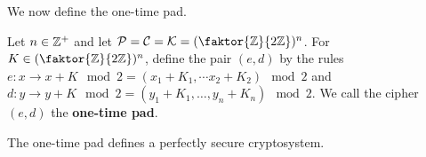 We now define the one-time pad.

\begin{definition}
    Let $n \in \mathbb{Z}^+$ and let  $\Pc=\Cc=\Kc=(\faktor{\Z}{2\Z})^n$. For $K \in
    (\faktor{\Z}{2\Z})^n$, define the pair $(e,d)$ by the rules $e:x \rightarrow
    x+K \mod{2}=(x_1+K_1, \dotsm x_2+K_2) \mod{2}$ and $d:y \rightarrow y+K
    \mod{2}=(y_1+K_1, \dots, y_n+K_n) \mod{2}$. We call the cipher $(e,d)$ the
    \textbf{one-time pad}.
\end{definition}

\begin{theorem}\label{2.1.3}
    The one-time pad defines a perfectly secure cryptosystem.
\end{theorem}
